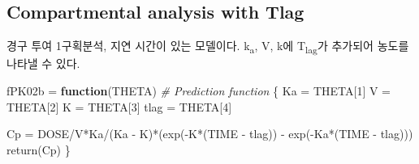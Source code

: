 \documentclass[
  11pt,
  krantz2, a4paper, twoside]{krantz}
\newenvironment{Shaded}{\begin{snugshade}}{\end{snugshade}}
\newcommand{\AttributeTok}[1]{\textcolor[rgb]{0.77,0.63,0.00}{#1}}
\newcommand{\CommentTok}[1]{\textcolor[rgb]{0.56,0.35,0.01}{\textit{#1}}}
\newcommand{\ControlFlowTok}[1]{\textcolor[rgb]{0.13,0.29,0.53}{\textbf{#1}}}
\newcommand{\DecValTok}[1]{\textcolor[rgb]{0.00,0.00,0.81}{#1}}
\newcommand{\FloatTok}[1]{\textcolor[rgb]{0.00,0.00,0.81}{#1}}
\newcommand{\FunctionTok}[1]{\textcolor[rgb]{0.00,0.00,0.00}{#1}}
\newcommand{\NormalTok}[1]{#1}
\newcommand{\OtherTok}[1]{\textcolor[rgb]{0.56,0.35,0.01}{#1}}
\newcommand{\SpecialCharTok}[1]{\textcolor[rgb]{0.00,0.00,0.00}{#1}}
\newcommand{\StringTok}[1]{\textcolor[rgb]{0.31,0.60,0.02}{#1}}
\theoremstyle{definition}
\theoremstyle{definition}
\theoremstyle{definition}
\theoremstyle{definition}
\theoremstyle{remark}
\begin{document}
\hypertarget{compartmental-analysis-with-tlag}{%
\subsection{Compartmental analysis with Tlag}\label{compartmental-analysis-with-tlag}}

경구 투여 1구획분석, 지연 시간이 있는 모델이다. k\textsubscript{a}, V, k에 T\textsubscript{lag}가 추가되어 농도를 나타낼 수 있다.

\begin{Shaded}
\begin{Highlighting}[]
\NormalTok{fPK02b }\OtherTok{=} \ControlFlowTok{function}\NormalTok{(THETA) }\CommentTok{\# Prediction function}
\NormalTok{\{}
\NormalTok{  Ka   }\OtherTok{=}\NormalTok{ THETA[}\DecValTok{1}\NormalTok{]}
\NormalTok{  V    }\OtherTok{=}\NormalTok{ THETA[}\DecValTok{2}\NormalTok{]}
\NormalTok{  K    }\OtherTok{=}\NormalTok{ THETA[}\DecValTok{3}\NormalTok{]}
\NormalTok{  tlag }\OtherTok{=}\NormalTok{ THETA[}\DecValTok{4}\NormalTok{]}

\NormalTok{  Cp  }\OtherTok{=}\NormalTok{ DOSE}\SpecialCharTok{/}\NormalTok{V}\SpecialCharTok{*}\NormalTok{Ka}\SpecialCharTok{/}\NormalTok{(Ka }\SpecialCharTok{{-}}\NormalTok{ K)}\SpecialCharTok{*}\NormalTok{(}\FunctionTok{exp}\NormalTok{(}\SpecialCharTok{{-}}\NormalTok{K}\SpecialCharTok{*}\NormalTok{(TIME }\SpecialCharTok{{-}}\NormalTok{ tlag)) }\SpecialCharTok{{-}} \FunctionTok{exp}\NormalTok{(}\SpecialCharTok{{-}}\NormalTok{Ka}\SpecialCharTok{*}\NormalTok{(TIME }\SpecialCharTok{{-}}\NormalTok{ tlag))) }
  \FunctionTok{return}\NormalTok{(Cp)}
\NormalTok{\}}
\end{Highlighting}
\end{Shaded}

\begin{Shaded}
\end{Shaded}
\end{document}
